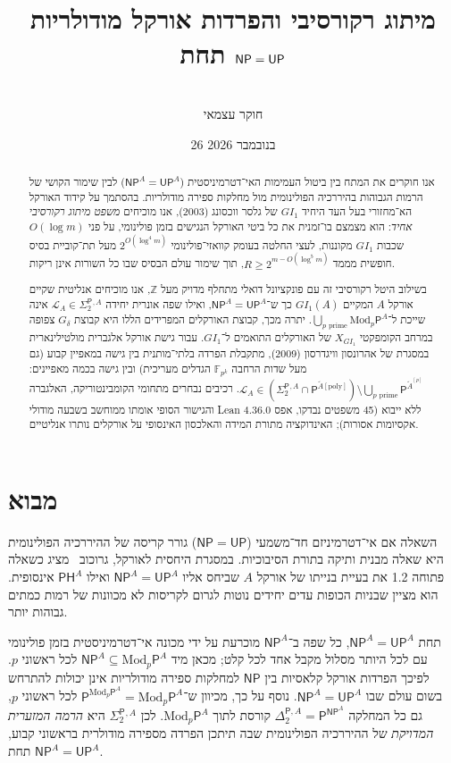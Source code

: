 \documentclass[11pt,a4paper]{article}
\title{\textbf{מיתוג רקורסיבי והפרדות אורקל מודולריות תחת $\NP = \UP$}}
\author{\EN{Aleksandr Strand}\\ \small חוקר עצמאי}
\date{26 בנובמבר 2026}
\theoremstyle{definition}
\theoremstyle{remark}
\newcommand{\Pcl}{\mathsf{P}}
\newcommand{\NP}{\mathsf{NP}}
\newcommand{\UP}{\mathsf{UP}}
\newcommand{\PH}{\mathsf{PH}}
\newcommand{\Modp}{\mathrm{Mod}_p\mathsf{P}}
\newcommand{\SigTwo}{\Sigma_2^{\mathsf{P}}}
\newcommand{\F}{\mathbb{F}}
\newcommand{\Z}{\mathbb{Z}}
\newcommand{\GI}{GI_1}
\newcommand{\EN}[1]{\textenglish{#1}}
\begin{document}
\maketitle

\begin{abstract}
אנו חוקרים את המתח בין ביטול העמימות האי־דטרמיניסטית ($\NP^A = \UP^A$) לבין שימור הקושי של הרמות הגבוהות בהיררכיה הפולינומית מול מחלקות ספירה מודולריות. בהסתמך על קידוד האורקל הא־מחזורי בעל העד היחיד $\GI$ של גלסר ווכסונג (2003), אנו מוכיחים \emph{משפט מיתוג רקורסיבי אחיד}: הוא מצמצם בו־זמנית את כל ביטי האורקל הנגישים בזמן פולינומי, על פני $O(\log m)$ שכבות $\GI$ מקוננות, לעצי החלטה בעומק קוואזי־פולינומי $2^{O(\log^4 m)}$ מעל תת־קוביית בסיס חופשית מממד $R \ge 2^{m - O(\log^5 m)}$, תוך שימור עולם הבסיס שבו כל השורות אינן ריקות.

בשילוב היטל רקורסיבי זה עם פונקציונל דואלי מתחלף מדויק מעל $\Z$, אנו מוכיחים אנליטית שקיים אורקל $A$ המקיים $\GI(A)$ כך ש־$\NP^A = \UP^A$, ואילו שפה אונרית יחידה $\mathcal{L}_A \in \SigTwo{}^{,A}$ אינה שייכת ל־$\bigcup_{p\text{ prime}} \Modp^A$. יתרה מכך, קבוצת האורקלים המפרידים הללו היא קבוצת $G_\delta$ צפופה במרחב הקומפקטי $X_{\GI}$ של האורקלים התואמים ל־$\GI$. עבור גישת אורקל אלגברית מולטילינארית במסגרת של אהרונסון וויגדרסון (2009), מתקבלת הפרדה בלתי־מותנית בין גישה במאפיין קבוע (גם מעל שדות הרחבה $\F_{p^k}$ הגדלים מעריכית) ובין גישה בכמה מאפיינים: $\mathcal{L}_A \in (\SigTwo{}^{,A} \cap \Pcl^{\widetilde{A}[\mathrm{poly}]}) \setminus \bigcup_{p\text{ prime}} \Pcl^{\widetilde{A}^{[p]}}$. רכיבים נבחרים מתחומי הקומבינטוריקה, האלגברה והגישור הסופי אומתו ממוחשב בשבעה מודולי \EN{Lean 4.36.0} ללא ייבוא (45 משפטים נבדקו, אפס אקסיומות אסורות); האינדוקציה מתורת המידה והאלכסון האינסופי על אורקלים נותרו אנליטיים.
\end{abstract}

\section{מבוא}

השאלה אם אי־דטרמיניזם חד־משמעי ($\NP = \UP$) גורר קריסה של ההיררכיה הפולינומית היא שאלה מבנית ותיקה בתורת הסיבוכיות. במסגרת היחסית לאורקל, גרוכוב~\cite{Grochow2023} מציג כשאלה פתוחה 1.2 את בעיית בנייתו של אורקל $A$ שביחס אליו $\NP^A = \UP^A$ ואילו $\PH^A$ אינסופית. הוא מציין שבניות הכופות עדים יחידים נוטות לגרום לקריסות לא מכוונות של רמות כמתים גבוהות יותר.

תחת $\NP^A = \UP^A$, כל שפה ב־$\NP^A$ מוכרעת על ידי מכונה אי־דטרמיניסטית בזמן פולינומי עם לכל היותר מסלול מקבל אחד לכל קלט; מכאן מיד $\NP^A \subseteq \Modp^A$ לכל ראשוני $p$. לפיכך הפרדות אורקל קלאסיות בין $\NP$ למחלקות ספירה מודולריות אינן יכולות להתרחש בשום עולם שבו $\NP^A = \UP^A$. נוסף על כך, מכיוון ש־$\Pcl^{\Modp^A} = \Modp^A$ לכל ראשוני $p$, גם כל המחלקה $\Delta_2^{\Pcl,A} = \Pcl^{\NP^A}$ קורסת לתוך $\Modp^A$. לכן $\SigTwo{}^{,A}$ היא \emph{הרמה המזערית המדויקת} של ההיררכיה הפולינומית שבה תיתכן הפרדה מספירה מודולרית בראשוני קבוע, תחת $\NP^A = \UP^A$.
\end{document}
